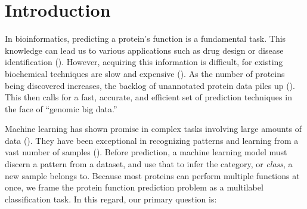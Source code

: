 %
%
%
%
%

\chapter{Introduction}
\label{Introduction}

\par In bioinformatics, predicting a protein's function is a fundamental
task. This knowledge can lead us to various applications such as drug design
or disease identification (\cite{baldi2001bioinformatics}). However,
acquiring this information is difficult, for existing biochemical techniques
are slow and expensive (\cite{cozzetto2017computational}). As the number of
proteins being discovered increases, the backlog of unannotated protein data
piles up (\cite{gaudet2017gene}). This then calls for a fast, accurate, and
efficient set of prediction techniques in the face of ``genomic big data.''
  
\par Machine learning has shown promise in complex tasks involving large
amounts of data (\cite{chen2014data}). They have been exceptional in
recognizing patterns and learning from a vast number of samples
(\cite{lecun2015deep}). Before prediction, a machine learning model must
discern a pattern from a dataset, and use that to infer the category, or
\textit{class}, a new sample belongs to. Because most proteins can perform
multiple functions at once, we frame the protein function prediction problem
as a multilabel classification task. In this regard, our primary question is:

